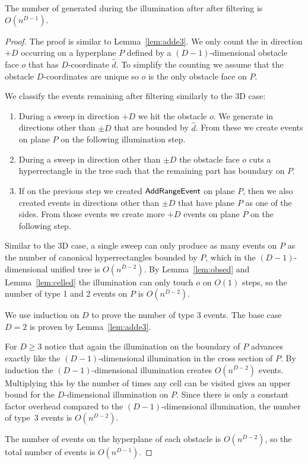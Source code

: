 \documentclass[english,gradu]{tktltiki2018}
\begin{document}
\begin{lem}\label{lem:added}The number of \addEs generated during the illumination after after filtering is $O(n^{D-1})$.\end{lem}
\begin{proof}
The proof is similar to Lemma~\ref{lem:adde3}.
We only count the \addEs in direction $+D$ occurring on a hyperplane $P$ defined by a $(D-1)$-dimensional obstacle face $o$ that has $D$-coordinate $\hat{d}$.
To simplify the counting we assume that the obstacle $D$-coordinates are unique so $o$ is the only obstacle face on $P$.

We classify the events remaining after filtering similarly to the 3D case:
\begin{enumerate}
\item During a sweep in direction $+D$ we hit the obstacle $o$.
	We generate \addEs in directions other than $\pm D$ that are bounded by $\hat{d}$.
	From these \addEs we create events on plane $P$ on the following illumination step.
\item During a sweep in direction other than $\pm D$ the obstacle face $o$ cuts a hyperrectangle in the tree such that the remaining part has boundary on $P$.
\item If on the previous step we created $\mathsf{AddRangeEvent}$ on plane $P$, then we also created events in directions other than $\pm D$ that have plane $P$ as one of the sides.
	From those events we create more $+D$ events on plane $P$ on the following step.
\end{enumerate}

Similar to the 3D case, a single sweep can only produce as many events on $P$ as the number of canonical hyperrectangles bounded by $P$, which in the $(D-1)$-dimensional unified tree is $O(n^{D-2})$.
By Lemma~\ref{lem:obsed} and Lemma~\ref{lem:celled} the illumination can only touch $o$ on $O(1)$ steps, so the number of type 1 and 2 events on $P$ is $O(n^{D-2})$.

We use induction on $D$ to prove the number of type 3 events.
The base case $D=2$ is proven by Lemma~\ref{lem:adde3}.

For $D\ge 3$ notice that again the illumination on the boundary of $P$ advances exactly like the $(D-1)$-dimensional illumination in the cross section of $P$.
By induction the $(D-1)$-dimensional illumination creates $O(n^{D-2})$ events.
Multiplying this by the number of times any cell can be visited gives an upper bound for the $D$-dimensional illumination on $P$.
Since there is only a constant factor overhead compared to the $(D-1)$-dimensional illumination, the number of type~3 events is $O(n^{D-2})$.

The number of events on the hyperplane of each obstacle is $O(n^{D-2})$, so the total number of events is $O(n^{D-1})$.
\end{proof}
\end{document}
